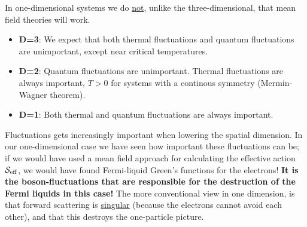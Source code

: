 In one-dimensional systems we do \underline{not}, unlike the three-dimensional, that mean field theories will work. 
\begin{itemize}
	\item \textbf{D=3}: We expect that both thermal fluctuations and quantum fluctuations are unimportant, except near critical temperatures.
	\item \textbf{D=2}: Quantum fluctuations are unimportant. Thermal fluctuations are always important, $T>0$ for systems with a continous symmetry (Mermin-Wagner theorem).
	\item \textbf{D=1}: Both thermal and quantum fluctuations are always important.
\end{itemize}
Fluctuations gets increasingly important when lowering the spatial dimension. In our one-dimensional case we have seen how important these fluctuations can be; if we would have used a mean field approach for calculating the effective action $\mathcal{S}_{\text{eff}}$, we would have found Fermi-liquid Green's functions for the electrons! \textbf{It is the boson-fluctuations that are responsible for the destruction of the Fermi liquids in this case!}
The more conventional view in one dimension, is that forward scattering is \underline{singular} (because the electrons cannot avoid each other), and that this destroys the one-particle picture.

